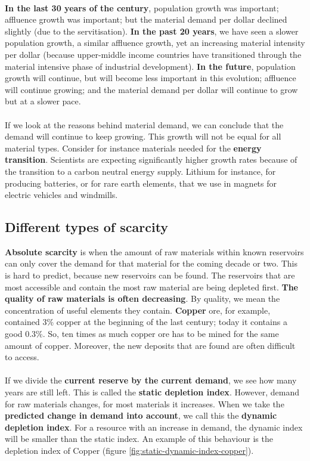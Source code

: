 \documentclass[../summary.tex]{subfiles}
\begin{document}
\ \\
\textbf{In the last 30 years of the  century}, population growth was important; affluence growth was important; but the material demand per dollar declined slightly (due to the servitisation). \textbf{In the past 20 years}, we have seen a slower population growth, a similar affluence growth, yet an increasing material intensity per dollar (because upper-middle income countries have transitioned through the material intensive phase of industrial development). \textbf{In the future}, population growth will continue, but will become less important in this evolution; affluence will continue growing; and the material demand per dollar will continue to grow but at a slower pace.
\\\\
If we look at the reasons behind material demand, we can conclude that the demand will continue to keep growing. This growth will not be equal for all material types. Consider for instance materials needed for the \textbf{energy transition}. Scientists are expecting significantly higher growth rates because of the transition to a carbon neutral energy supply. Lithium for instance, for producing batteries, or for rare earth elements, that we use in magnets for electric vehicles and windmills.

\subsection{Different types of scarcity}

\textbf{Absolute scarcity} is when the amount of raw materials within known reservoirs can only cover the demand for that material for the coming decade or two. This is hard to predict, because new reservoirs can be found. The reservoirs that are most accessible and contain the most raw material are being depleted first. \textbf{The quality of raw materials is often decreasing}. By quality, we mean the concentration of useful elements they contain. \textbf{Copper} ore, for example, contained 3\% copper at the beginning of the last century; today it contains a good 0.3\%. So, ten times as much copper ore has to be mined for the same amount of copper. Moreover, the new deposits that are found are often difficult to access.
\\\\
If we divide the \textbf{current reserve by the current demand}, we see how many years are still left. This is called the \textbf{static depletion index}. However, demand for raw materials changes, for most materials it increases. When we take the \textbf{predicted change in demand into account}, we call this the \textbf{dynamic depletion index}. For a resource with an increase in demand, the dynamic index will be smaller than the static index. An example of this behaviour is the depletion index of Copper (figure \ref{fig:static-dynamic-index-copper}).
\end{document}
